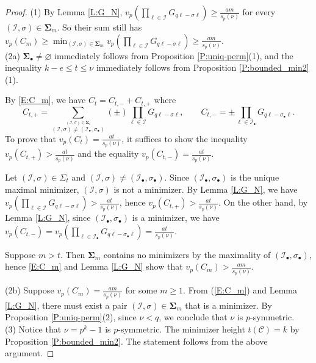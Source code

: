 \documentclass[10pt,a4paper]{amsart}
\newcommand{\Ib}{\cI_\bullet}
\newcommand{\Sb}{\bSig_\bullet}
\newcommand{\bSig}{\mathbf\Sigma}
\newcommand{\cC}{\mathcal{C}}
\newcommand{\cI}{\mathcal{I}}
\newcommand{\sbb}{\sigma_\bullet}
\begin{document}
\begin{proof}
(1) By Lemma \ref{L:G_N},
$ v_p(\prod_{\ell\in \cI}
    G_{q\ell - \sigma \ell})\ge \frac{am}{s_p(\nu)}
$ for every $(\cI,\sigma)\in \bSig_m$.
So their sum still has 
$v_p(C_m) \ge \min_{(\cI,\sigma)\in\bSig_m} v_p(\prod_{\ell\in \cI}
    G_{q\ell - \sigma \ell})\ge \frac{am}{s_p(\nu)}.$
\\
(2a)
$\Sb \ne \varnothing$ immediately follows from
Proposition \ref{P:uniq-perm}(1),
and the inequality $k-e \le t \le \nu$ immediately follows from
Proposition \ref{P:bounded_min2}(1).

By \eqref{E:C_m}, we have 
$
C_t=C_{t,-} + C_{t,+}
$
where 
\begin{equation*}
    C_{t,+}= 
    \sum_{\stackrel{(\cI,\sigma)\in \bSig_t}{(\cI,\sigma)\ne (\Ib,\sbb)}}
    (\pm)\prod_{\ell\in \cI} G_{q \ell - \sigma\ell},\qquad
C_{t,-}=\pm \prod_{\ell\in \Ib}G_{q\ell-\sbb\ell}.
\end{equation*}
To prove that $v_p(C_t)=\frac{at}{s_p(\nu)}$, it suffices to show
the inequality
$v_p(C_{t,+})>\frac{at}{s_p(\nu)}$
and the equality
$v_p(C_{t,-})=\frac{at}{s_p(\nu)}$.   

Let  $(\cI,\sigma)\in \Sigma_t$ and $(\cI,\sigma)\neq (\Ib,\sbb)$.
Since $(\Ib,\sbb)$ is the unique maximal minimizer,
$(\cI,\sigma)$ is not a minimizer.
By Lemma \ref{L:G_N}, we have
 $
        v_p\left(\prod_{\ell \in \cI} G_{q\ell - \sigma\ell}\right)
            > \frac{at}{s_p(\nu)}
$,
hence
 $v_p(C_{t,+})>\frac{at}{s_p(\nu)}$.
On the other hand, by Lemma \ref{L:G_N}, since $(\Ib,\sbb)$ is a minimizer,
we have
$v_p(C_{t,-})=
v_p(\prod_{\ell\in \Ib}G_{q\ell-\sbb\ell}) = \frac{at}{s_p(\nu)}$.

Suppose $m>t$.
Then $\bSig_m$ contains no minimizers by the maximality of $(\Ib,\sbb)$, 
hence \eqref{E:C_m} and Lemma \ref{L:G_N} show that 
$v_p(C_m)>\frac{am}{s_p(\nu)}$.

\noindent 
(2b)
Suppose $v_p(C_m)=\frac{a m}{s_p(\nu)}$ for some $m\ge 1$.
From (\ref{E:C_m}) and Lemma \ref{L:G_N},
there must exist a pair $(\cI,\sigma)\in \bSig_m$ 
that is a minimizer.
By  Proposition \ref{P:uniq-perm}(2), since $\nu<q$, 
we conclude that $\nu$ is $p$-symmetric.    
\\
(3) 
Notice that  $\nu=p^k-1$ is $p$-symmetric.
The minimizer height $t(\cC)=k$ by Proposition \ref{P:bounded_min2}.
The statement follows from the above argument. 
\end{proof}
\end{document}
